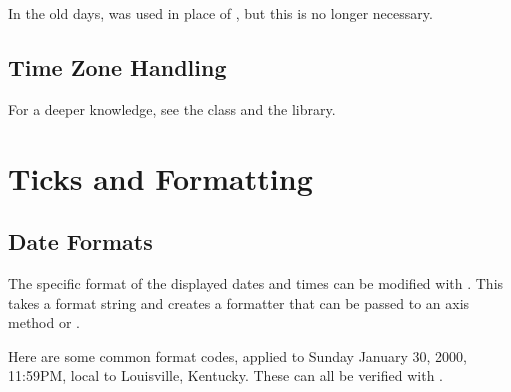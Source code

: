 In the old days,  was used in place of , but this is no longer necessary.


\subsection{Time Zone Handling}



For a deeper knowledge, see the  class and the  library. 

\section{Ticks and Formatting}


\subsection{Date Formats}

The specific format of the displayed dates and times can be modified with . This takes a format string and creates a formatter that can be passed to an axis method  or . 

Here are some common format codes, applied to Sunday January 30, 2000, 11:59PM, local to Louisville, Kentucky. These can all be verified with .

